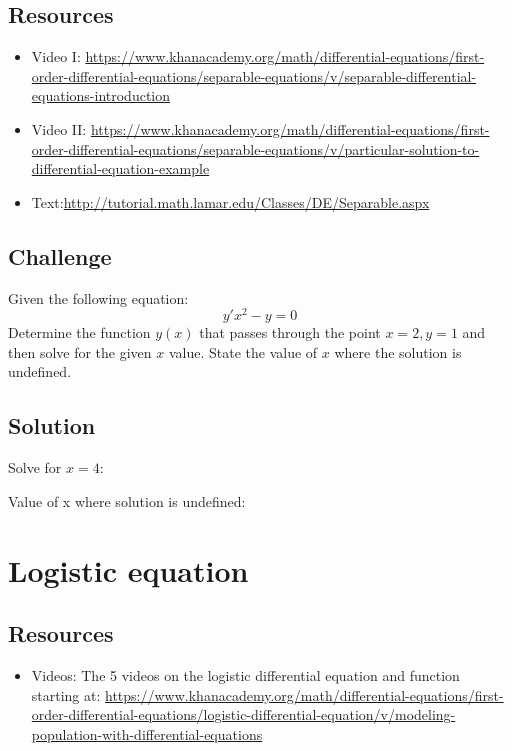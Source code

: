 \subsection*{Resources}
\begin{itemize}
    \item Video I: \url{https://www.khanacademy.org/math/differential-equations/first-order-differential-equations/separable-equations/v/separable-differential-equations-introduction} 
    \item Video II: \url{https://www.khanacademy.org/math/differential-equations/first-order-differential-equations/separable-equations/v/particular-solution-to-differential-equation-example}
    \item Text:\url{http://tutorial.math.lamar.edu/Classes/DE/Separable.aspx}
\end{itemize}

\subsection*{Challenge}
Given the following equation:
\begin{equation}
    y' x^2 - y = 0
\end{equation}
Determine the function $y(x)$ that passes through the point $x=2,y=1$ and then solve for the given $x$ value. State the value of $x$ where the solution is undefined. %

\subsection*{Solution}
Solve for $x=4$:

\six{}


Value of x where solution is undefined:

\six{}


\timebox








\newpage
\section{Logistic equation}

\subsection*{Resources}
\begin{itemize}
    \item Videos: The 5 videos on the logistic differential equation and function starting at: \url{https://www.khanacademy.org/math/differential-equations/first-order-differential-equations/logistic-differential-equation/v/modeling-population-with-differential-equations}
\end{itemize}

